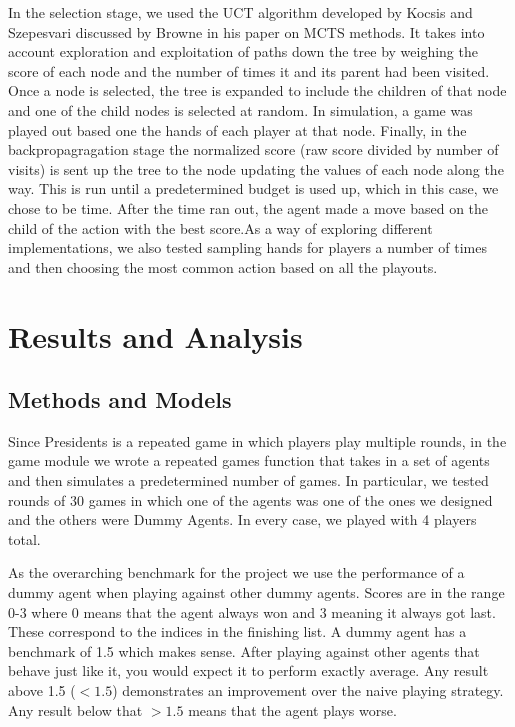 \documentclass[11pt]{article}
\begin{document}
In the selection stage, we used the UCT algorithm developed by Kocsis and Szepesvari discussed by Browne in his paper on MCTS methods. It takes into account exploration and exploitation of paths down the tree by weighing the score of each node and the number of times it and its parent had been visited. Once a node is selected, the tree is expanded to include the children of that node and one of the child nodes is selected at random. In simulation, a game was played out based one the hands of each player at that node. Finally, in the backpropagragation stage the normalized score (raw score divided by number of visits) is sent up the tree to the node updating the values of each node along the way. This is run until a predetermined budget is used up, which in this case, we chose to be time. After the time ran out, the agent made a move based on the child of the action with the best score.As a way of exploring different implementations, we also tested sampling hands for players a number of times and then choosing the most common action based on all the playouts.

\section{Results and Analysis}

\subsection{Methods and Models}

Since Presidents is a repeated game in which players play multiple rounds, in the game module we wrote a repeated games function that takes in a set of agents and then simulates a predetermined number of games. In particular, we tested rounds of 30 games in which one of the agents was one of the ones we designed and the others were Dummy Agents. In every case, we played with 4 players total.

As the overarching benchmark for the project we use the performance of a dummy agent when playing against other dummy agents. Scores are in the range 0-3 where 0 means that the agent always won and 3 meaning it always got last. These correspond to the indices in the finishing list. A dummy agent has a benchmark of 1.5 which makes sense. After playing against other agents that behave just like it, you would expect it to perform exactly average. Any result above 1.5 ($<1.5$) demonstrates an improvement over the naive playing strategy. Any result below that $>1.5$ means that the agent plays worse.
\end{document}
